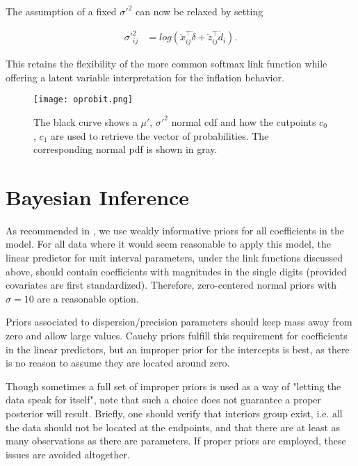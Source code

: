 The assumption of a fixed $\sigma'^{2}$ can now be relaxed by setting

\begin{equation}
\begin{split}
\sigma'^{2}_{ij} &= log(\ddot{x}_{ij}^{\top} \ddot{\delta}+\ddot{z}_{ij}^{\top} \ddot{d}_i).
\end{split}
\label{eq:oprobit2}
\end{equation}

This retains the flexibility of the more common softmax link function while offering a latent variable interpretation for the inflation behavior.

\begin{figure}
  \texttt{[image: oprobit.png]}
  \caption{The black curve shows a $\mu'$, $\sigma'^{2}$ normal cdf and how the cutpoints $c_0$, $c_1$ are used to retrieve the vector of probabilities. The corresponding normal pdf is shown in gray.}
  \label{fig:oprobit}
\end{figure}

\section{Bayesian Inference}

As recommended in \cite{Gelman2013}, we use weakly informative priors for all coefficients in the model. For all data where it would seem reasonable to apply this model, the linear predictor for unit interval parameters, under the link functions discussed above, should contain coefficients with magnitudes in the single digits (provided covariates are first standardized). Therefore, zero-centered normal priors with $\sigma=10$ are a reasonable option.

Priors associated to dispersion/precision parameters should keep mass away from zero and allow large values. Cauchy priors fulfill this requirement for coefficients in the linear predictors, but an improper prior for the intercepts is best, as there is no reason to assume they are located around zero.

Though sometimes a full set of improper priors is used as a way of "letting the data speak for itself",  note that such a choice does not guarantee a proper posterior will result. \cite{Tak2015} Briefly, one should verify that interiors group exist, i.e. all the data should not be located at the endpoints, and that there are at least as many observations as there are parameters. If proper priors are employed, these issues are avoided altogether.

